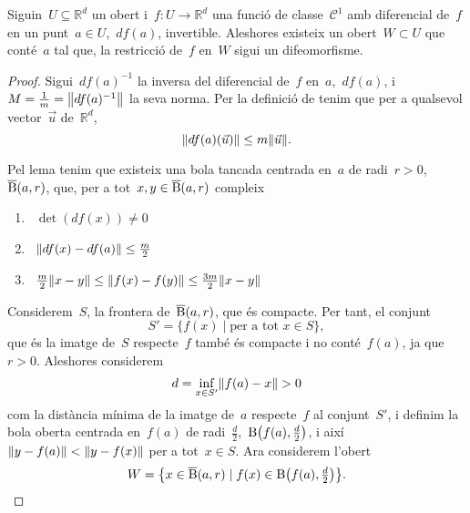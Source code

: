 \documentclass[../../main.tex]{subfiles}
\begin{document}
    \begin{theorem}
        \label{thm:Funció inversa}
        Siguin~\(U\subseteq\mathbb{R}^{d}\) un obert i~\(f\colon U\to\mathbb{R}^{d}\) una funció de classe~\(\mathcal{C}^{1}\) amb diferencial de~\(f\) en un punt~\(a\in U\),~\(df(a)\), invertible.
        Aleshores existeix un obert~\(W\subset U\) que conté~\(a\) tal que, la restricció de~\(f\) en~\(W\) sigui un difeomorfisme.
        \begin{proof}
            Sigui~\(df(a)^{-1}\) la inversa del diferencial de~\(f\) en~\(a\),~\(df(a)\), i~\(M=\frac{1}{m}=\norm{df(a)^{-1}}\) la seva norma.
            Per la definició de  tenim que per a qualsevol vector~\(\vec{u}\) de~\(\mathbb{R}^{d}\),
            \[
                \norm{df(a)(\vec{u})}\leq m\norm{\vec{u}}.
            \]

            Pel lema  tenim que existeix una bola tancada centrada en~\(a\) de radi~\(r>0\),~\(\overline{\operatorname{B}}(a,r)\), que, per a tot~\(x,y\in\overline{\operatorname{B}}(a,r)\) compleix
            \begin{enumerate}
                \item\label{enum:thFunció inversa 1}~\(\det(df(x))\neq0\)
                \item\label{enum:thFunció inversa 2}~\(\norm{df(x)-df(a)}\leq\frac{m}{2}\)
                \item\label{enum:thFunció inversa 3}~\(\frac{m}{2}\norm{x-y} \leq\norm{f(x)-f(y)}\leq\frac{3m}{2}\norm{x-y}\)
            \end{enumerate}

            Considerem~\(S\), la frontera de~\(\overline{\operatorname{B}}(a,r)\), que és compacte.
            Per tant, el conjunt
            \[
                S'=\{f(x)\mid\text{per a tot }x\in S\},
            \]
            que és la imatge de~\(S\) respecte~\(f\) també és compacte i no conté~\(f(a)\), ja que~\(r>0\).
            Aleshores considerem
            \[
                d=\inf_{x\in S'}\norm{f(a)-x}>0
            \]
            com la distància mínima de la imatge de~\(a\) respecte~\(f\) al conjunt~\(S'\), i definim la bola oberta centrada en~\(f(a)\) de radi~\(\frac{d}{2}\),~\(\B\left(f(a),\tfrac{d}{2}\right)\), i així~\(\norm{y-f(a)}<\norm{y-f(x)}\) per a tot~\(x\in S\).
            Ara considerem l'obert
            \[
                W=\left\{x\in\overline{\B}(a,r)\mid f(x)\in\B\left(f(a),\tfrac{d}{2}\right)\right\}.
            \]


\end{proof}
\end{theorem}
\end{document}
